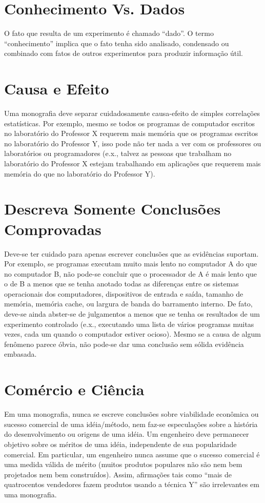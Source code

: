\section{Conhecimento Vs. Dados}

O fato que resulta de um experimento é chamado ``dado''. 
O termo ``conhecimento'' implica que o fato tenha sido analisado, condensado ou combinado com fatos de outros experimentos para produzir informação útil.

\section{Causa e Efeito}

Uma monografia deve separar cuidadosamente causa-efeito de simples correlações estatísticas. Por exemplo, mesmo se todos os programas de computador escritos no laboratório do Professor X requerem mais memória que os programas escritos no laboratório do Professor Y, isso pode não ter nada a ver com os professores ou laboratórios ou programadores (e.x., talvez as pessoas que trabalham no laboratório do Professor X estejam trabalhando em aplicações que requerem mais memória do que no laboratório do Professor Y).

\section{Descreva Somente Conclusões Comprovadas}   		

Deve-se ter cuidado para apenas escrever conclusões que as evidências suportam. Por exemplo, se programas executam muito mais lento no computador A do que no computador B, 
não pode-se concluir que o processador de A é mais lento que o de B a menos que se tenha anotado todas as diferenças entre os sistemas operacionais dos computadores, dispositivos de entrada e saída, 
tamanho de memória, memória cache, ou largura de banda do barramento interno. 
De fato, deve-se ainda abster-se de julgamentos a menos que se tenha os resultados de um experimento controlado (e.x., executando uma lista de vários programas muitas vezes, cada um quando o computador 
estiver ocioso). Mesmo se a causa de algum fenômeno parece óbvia, não pode-se dar uma conclusão sem sólida evidência embasada.

\section{Comércio e Ciência}

Em uma monografia, nunca se escreve conclusões sobre viabilidade econômica ou sucesso comercial de uma idéia/método, nem faz-se especulações sobre a história do desenvolvimento ou origens de
uma idéia. Um engenheiro deve permanecer objetivo sobre os méritos de uma idéia, independente de sua popularidade comercial. Em particular, um engenheiro nunca assume que o sucesso comercial é uma medida válida 
de mérito (muitos produtos populares não são nem bem projetados nem bem construídos). Assim, afirmações tais como ``mais de quatrocentos vendedores fazem produtos usando a técnica Y'' são irrelevantes em uma monografia.

